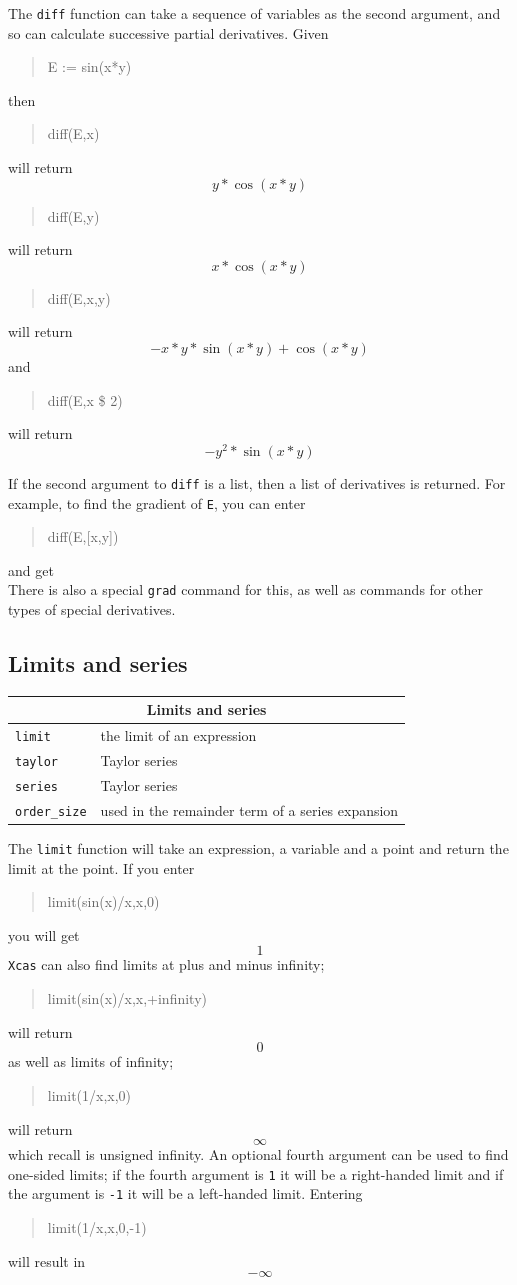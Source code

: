 \documentclass{article}
\newcommand{\xcasin}[1]
{\begin{quote}\ttfamily
#1
\end{quote}}
\newcommand{\xcasout}[1]
{\begin{equation*}
#1
\end{equation*}}
\begin{document}
The \texttt{diff} function can take a sequence of variables as the
second argument, and so can calculate successive partial derivatives.
Given
\xcasin{E := sin(x*y)}
then
\xcasin{diff(E,x)}
will return
\xcasout{y*\cos(x*y)}
\xcasin{diff(E,y)}
will return
\xcasout{x*\cos(x*y)}
\xcasin{diff(E,x,y)}
will return
\xcasout{-x*y*\sin(x*y) + \cos(x*y)}
and
\xcasin{diff(E,x \$ 2)}
will return
\xcasout{-y^2*\sin(x*y)}

If the second argument to \texttt{diff} is a list, then a list of
derivatives is returned.  For example, to find the gradient of
\texttt{E}, you can enter
\xcasin{diff(E,[x,y])}
and get
\xcasout{[y*\cos(x*y),x*\cos(x*y)]}
There is also a special \texttt{grad} command for this, as well as
commands for other types of special derivatives.


\subsection{Limits and series}

\begin{center}
\begin{tabular}{|p{}|p{}|}
\hline
\multicolumn{2}{|c|}{\textbf{Limits and series}}\\
\hline\hline
\texttt{limit} & the limit of an expression\\
\texttt{taylor} & Taylor series\\
\texttt{series} & Taylor series\\
\texttt{order\_size} & used in the remainder term of a series expansion\\
\hline
\end{tabular}
\end{center}

The \texttt{limit} function will take an expression, a variable and a
point and return the limit at the point.  If you enter
\xcasin{limit(sin(x)/x,x,0)}
you will get
\xcasout{1}
\texttt{Xcas} can also find limits at plus and minus infinity;
\xcasin{limit(sin(x)/x,x,+infinity)}
will return
\xcasout{0}
as well as limits of infinity;
\xcasin{limit(1/x,x,0)}
will return
\xcasout{\infty}
which recall is unsigned infinity.
An optional fourth argument can be used to find one-sided limits; if
the fourth argument is \texttt{1} it will be a right-handed limit and
if the argument is \texttt{-1} it will be a left-handed limit.
Entering
\xcasin{limit(1/x,x,0,-1)}
will result in
\xcasout{-\infty}
\end{document}
